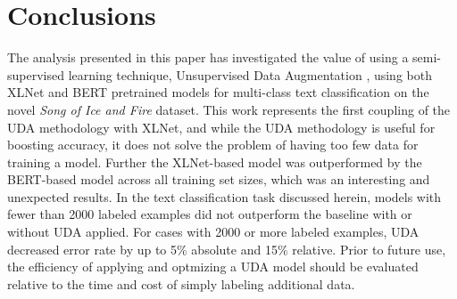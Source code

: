 \documentclass[twoside,twocolumn,10pt]{article}
\begin{document}
\section{Conclusions} \label{conclusions}
The analysis presented in this paper has investigated the value of using a semi-supervised learning technique, Unsupervised Data Augmentation \cite{Xie:2019}, using both XLNet and BERT pretrained models for multi-class text classification on the novel \textit{Song of Ice and Fire} dataset. This work represents the first coupling of the UDA methodology with XLNet, and
while the UDA methodology is useful for boosting accuracy, it does not solve the problem of having too few data for training a model. Further the XLNet-based model was outperformed by the BERT-based model across all training set sizes, which was an interesting and unexpected results.  In the text classification task discussed herein, models with fewer than 2000 labeled examples did not outperform the baseline with or without UDA applied. For cases with 2000 or more labeled examples, UDA decreased error rate by up to 5\% absolute and 15\% relative. Prior to future use, the efficiency of applying and optmizing a UDA model should be evaluated relative to the time and cost of simply labeling additional data.
\end{document}
